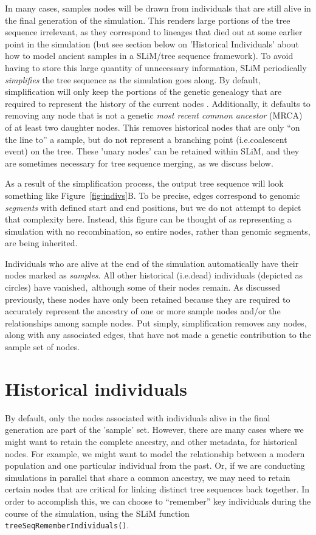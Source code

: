 \documentclass[12pt]{article}
\newcommand*{\ie}{i.e.\xcomma}
\begin{document}
In many cases, samples nodes will be drawn from individuals that are still alive in the final generation
of the simulation. This renders large portions of the tree sequence irrelevant, as they
correspond to lineages that died out at some earlier point in the simulation (but see section below on
'Historical Individuals' about how to model ancient samples in a SLiM/tree sequence framework). To avoid having to
store this large quantity of unnecessary information, SLiM periodically \textit{simplifies} the tree sequence
as the simulation goes along. By default, simplification will only keep the portions of the
genetic genealogy that are required to represent the history of the current nodes
\citep{kelleher}. Additionally, it defaults to removing any node that is not a genetic
\textit{most recent common ancestor} (MRCA) of at least two daughter nodes. This removes historical
nodes that are only ``on the line to'' a sample, but do not represent a branching point
(\ie coalescent event) on the tree. These 'unary nodes' can be retained within SLiM, and they are
sometimes necessary for tree sequence merging, as we discuss below.

As a result of the simplification process, the output tree sequence will look something like Figure~\ref{fig:indivs}B.
To be precise, edges correspond to genomic \emph{segments} with defined start and end positions,
but we do not attempt to depict that complexity here. Instead, this figure can be thought of as representing a simulation
with no recombination, so entire nodes, rather than genomic segments, are being inherited.

Individuals who are alive at the end of the simulation automatically have their nodes marked as
\textit{samples}. All other historical (\ie dead) individuals (depicted as circles) have vanished,\
although some of their nodes remain. As discussed previously, these nodes have only been retained because they are required to
accurately represent the ancestry of one or more sample nodes and/or the relationships among sample nodes.
Put simply, simplification removes any nodes, along with any associated edges,
that have not made a genetic contribution to the sample set of nodes.

\section*{Historical individuals}
By default, only the nodes associated with individuals alive in the final generation are part of the 'sample' set.
However, there are many cases where we might want to retain the complete ancestry, and other metadata, for
historical nodes. For example, we might want to model the relationship between a modern population and
one particular individual from the past. Or, if we are conducting simulations in parallel that share 
a common ancestry, we may need to retain certain nodes that are critical for linking distinct
tree sequences back together.
In order to accomplish this, we can choose to ``remember'' key individuals during the course of the simulation,
using the SLiM function \verb|treeSeqRememberIndividuals()|.
\end{document}
